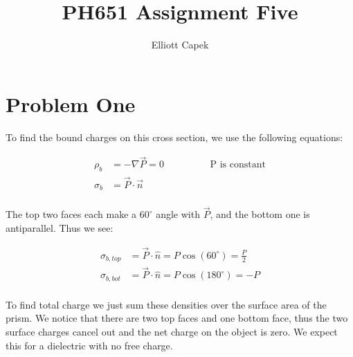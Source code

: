 \documentclass[10pt]{article} %
\title{PH651 Assignment Five}
\author{Elliott Capek}
\begin{document}
\maketitle{}

\section{Problem One}
To find the bound charges on this cross section, we use the following equations:

\begin{align*}
  \rho_b &= -\nabla \vec{P} = 0\hspace{2cm} \mbox{P is constant}\\
  \sigma_b &= \vec{P} \cdot \vec{n}\\
\end{align*}

The top two faces each make a $60^\circ$ angle with $\vec{P}$, and the bottom one is antiparallel. Thus we see:

\begin{align*}
  \sigma_{b,top} &= \vec{P} \cdot \hat{n} = P\cos\left(60^\circ\right) = \frac P2\\
  \sigma_{b,bot} &= \vec{P} \cdot \hat{n} = P\cos\left(180^\circ\right) = -P\\
\end{align*}

To find total charge we just sum these densities over the surface area of the prism. We notice that there are two top faces and one
bottom face, thus the two surface charges cancel out and the net charge on the object is zero. We expect this for a dielectric with
no free charge.
\end{document}

